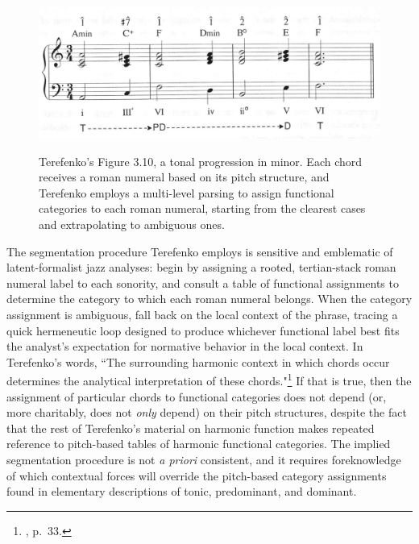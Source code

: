 \begin{figure}
	\centering
	\caption{Terefenko's Figure 3.10, a tonal progression in minor.  Each chord receives a roman numeral based on its pitch structure, and Terefenko employs a multi-level parsing to assign functional categories to each roman numeral, starting from the clearest cases and extrapolating to ambiguous ones.}
	\includegraphics[width=5in]{Terefenko_ex.png}
	\label{Terefenko_ex}
\end{figure}

The segmentation procedure Terefenko employs is sensitive and emblematic of latent-formalist jazz analyses: begin by assigning a rooted, tertian-stack roman numeral label to each sonority, and consult a table of functional assignments to determine the category to which each roman numeral belongs.  When the category assignment is ambiguous, fall back on the local context of the phrase, tracing a quick hermeneutic loop designed to produce whichever functional label best fits the analyst's expectation for normative behavior in the local context.  In Terefenko's words, ``The surrounding harmonic context in which chords occur determines the analytical interpretation of these chords."\footnote{\cite{terefenko2014}, p.\ 33.}  If that is true, then the assignment of particular chords to functional categories does not depend (or, more charitably, does not \emph{only} depend) on their pitch structures, despite the fact that the rest of Terefenko's material on harmonic function makes repeated reference to pitch-based tables of harmonic functional categories.  The implied segmentation procedure is not \emph{a priori} consistent, and it requires foreknowledge of which contextual forces will override the pitch-based category assignments found in elementary descriptions of tonic, predominant, and dominant.

